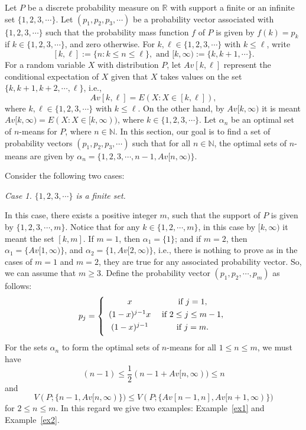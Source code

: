 \documentclass[12pt, reqno]{amsart}
\theoremstyle{plain}
\theoremstyle{definition}
\newcommand{\set}[1]{\{#1\}}%
\newcommand{\ga}{\alpha}
\newcommand{\tit}{\textit}%
\newcommand{\D}[1]{\mathbb{#1}}%
\newcommand{\te}{\text}%
\begin{document}
Let $P$ be a discrete probability measure on $\D R$ with support a finite or an infinite set $\set{1, 2, 3,\cdots}$. Let $(p_1, p_2, p_3,\cdots)$ be a probability vector associated with $\set{1, 2, 3, \cdots}$ such that the probability mass function $f$ of $P$ is given by $f(k)=p_k$ if $k\in \set{1, 2, 3, \cdots}$, and zero otherwise. For $k, \ell\in \set{1, 2, 3, \cdots}$ with $k\leq \ell$, write
\[[k, \ell]:=\set{n : k\leq n\leq \ell},\te{ and } [k, \infty):=\set{k, k+1, \cdots}.\]
For a random variable $X$ with distribution $P$, let $Av[k, \ell]$ represent the conditional expectation of $X$ given that $X$ takes values on the set $\set{k, k+1, k+2, \cdots, \ell}$, i.e.,
\[Av[k, \ell]=E(X : X\in [k, \ell]),\]
where $k, \ell\in \set{1, 2, 3, \cdots}$ with $k\leq \ell$. On the other hand, by $Av[k, \infty)$ it is meant $Av[k, \infty)=E(X : X\in [k, \infty))$, where $k\in \set{1, 2, 3, \cdots}$.
Let $\ga_n$ be an optimal set of $n$-means for $P$, where $n\in \D N$. In this section, our goal is to find a set of probability vectors $(p_1, p_2, p_3,\cdots)$ such that for all $n\in \D N$, the optimal sets of $n$-means are given by
$\ga_n=\set{1, 2, 3, \cdots, n-1, Av[n, \infty)}.$

Consider the following two cases:

\tit{Case 1. $\set{1, 2, 3,\cdots}$ is a finite set.}

In this case, there exists a positive integer $m$, such that the support of $P$ is given by $\set{1, 2, 3, \cdots, m}$. Notice that for any $k\in \set{1, 2, \cdots, m}$, in this case by $[k, \infty)$ it meant the set $[k, m]$. If $m=1$, then $\ga_1=\set{1}$; and if $m=2$, then $\ga_1=\set{Av[1, \infty)}$, and $\ga_2=\set{1, Av[2, \infty)}$, i.e., there is nothing to prove as in the cases of $m=1$ and $m=2$, they are true for any associated probability vector. So, we can assume that $m\geq 3$. Define the probability vector $(p_1, p_2, \cdots, p_m)$ as follows:
\begin{align}
\label{eq340}
p_j=\left\{\begin{array}{ccc} \vspace{0.05 in}
x &\te{ if } j=1,  \\\vspace{0.05 in}
(1-x)^{j-1} x & \te{ if } 2\leq j\leq m-1,\\\vspace{0.05 in}
(1-x)^{j-1} & \te{ if } j=m.
\end{array}
\right.
\end{align}
For the sets $\ga_n$ to form the optimal sets of $n$-means for all $1\leq n\leq m$, we must have
\begin{equation} \label{eq345} (n-1)\leq \frac 12 (n-1+Av[n, \infty))\leq n
\end{equation}
and 
\begin{equation} \label{eq346} 
V(P;  \set{n-1, Av[n,\infty)}) \leq V(P; \set{Av[n-1,n], Av[n+1, \infty)})
\end{equation}
for $2\leq n\leq m$. In this regard we give two examples:  Example~\ref{ex1} and Example~\ref{ex2}.
\end{document}
